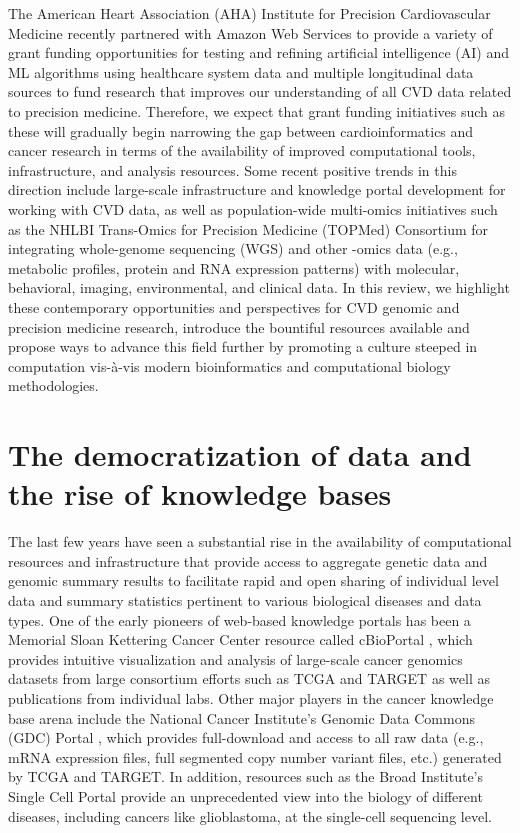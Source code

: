 \documentclass[letter]{bib}
\begin{document}
The American Heart Association (AHA) Institute for Precision Cardiovascular Medicine recently partnered with Amazon Web Services to provide a variety of grant funding opportunities for testing and refining artificial intelligence (AI) and ML algorithms using healthcare system data and multiple longitudinal data sources to fund research that improves our understanding of all CVD data related to precision medicine.  Therefore, we expect that grant funding initiatives such as these will gradually begin narrowing the gap between cardioinformatics and cancer research in terms of the availability of improved computational tools, infrastructure, and analysis resources.  Some recent positive trends in this direction include large-scale infrastructure and knowledge portal development \citep{Khomtchouk:2019:HeartBioPortal,Kass-Hout:2018:American,Crawford:2018:Cerebrovascular} for working with CVD data, as well as population-wide multi-omics initiatives such as the NHLBI Trans-Omics for Precision Medicine (TOPMed) Consortium \citep{NHLBI:2014:TransOmics} for integrating whole-genome sequencing (WGS) and other -omics data (e.g., metabolic profiles, protein and RNA expression patterns) with molecular, behavioral, imaging, environmental, and clinical data.  In this review, we highlight these contemporary opportunities and perspectives for CVD genomic and precision medicine research, introduce the bountiful resources available and propose ways to advance this field further by promoting a culture steeped in computation vis-\`{a}-vis modern bioinformatics and computational biology methodologies.


\section*{The democratization of data and the rise of knowledge bases}

The last few years have seen a substantial rise in the availability of computational resources and infrastructure that provide access to aggregate genetic data and genomic summary results to facilitate rapid and open sharing of individual level data and summary statistics pertinent to various biological diseases and data types.  One of the early pioneers of web-based knowledge portals has been a Memorial Sloan Kettering Cancer Center resource called cBioPortal \citep{Cerami:2012:cBio,Gao:2013:Integrative}, which provides intuitive visualization and analysis of large-scale cancer genomics datasets from large consortium efforts such as TCGA \citep{TCGA:2013:Cancer} and TARGET \citep{Koscielny:2017:Open} as well as publications from individual labs.  Other major players in the cancer knowledge base arena include the National Cancer Institute's Genomic Data Commons (GDC) Portal \citep{Grossman:2016:Shared,Jensen:2017:NCI}, which provides full-download and access to all raw data (e.g., mRNA expression files, full segmented copy number variant files, etc.) generated by TCGA and TARGET.  In addition, resources such as the Broad Institute's Single Cell Portal \citep{Broad:NA:Single} provide an unprecedented view into the biology of different diseases, including cancers like glioblastoma, at the single-cell sequencing level.    
	
\end{document}
